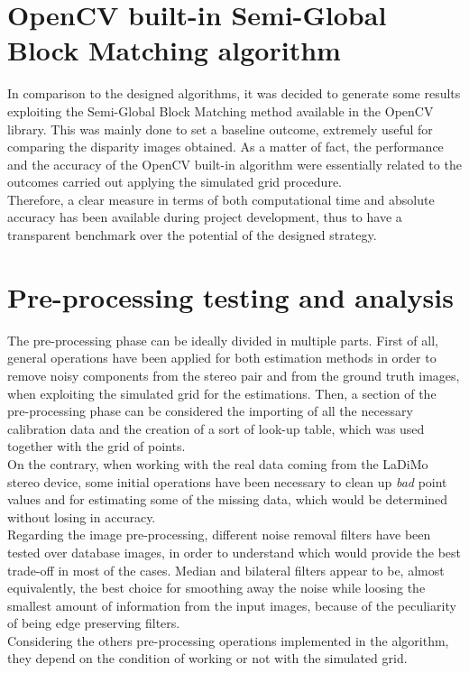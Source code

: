 \section{OpenCV built-in Semi-Global Block Matching algorithm}
\label{section:opencv-sgm-method}

In comparison to the designed algorithms, it was decided to generate some results exploiting the Semi-Global Block Matching method available in the OpenCV library.
This was mainly done to set a baseline outcome, extremely useful for comparing the disparity images obtained.
As a matter of fact, the performance and the accuracy of the OpenCV built-in algorithm were essentially related to the outcomes carried out applying the simulated grid procedure.\\
Therefore, a clear measure in terms of both computational time and absolute accuracy has been available during project development, thus to have a transparent benchmark over the potential of the designed strategy.

\section{Pre-processing testing and analysis}
\label{section:pre-processing-impl}

The pre-processing phase can be ideally divided in multiple parts.
First of all, general operations have been applied for both estimation methods in order to remove noisy components from the stereo pair and from the ground truth images, when exploiting the simulated grid for the estimations.
Then, a section of the pre-processing phase can be considered the importing of all the necessary calibration data and the creation of a sort of look-up table, which was used together with the grid of points.\\
On the contrary, when working with the real data coming from the LaDiMo stereo device, some initial operations have been necessary to clean up \textit{bad} point values and for estimating some of the missing data, which would be determined without losing in accuracy. \\
Regarding the image pre-processing, different noise removal filters have been tested over database images, in order to understand which would provide the best trade-off in most of the cases. 
Median and bilateral filters appear to be, almost equivalently, the best choice for smoothing away the noise while loosing the smallest amount of information from the input images, because of the peculiarity of being edge preserving filters. \\
Considering the others pre-processing operations implemented in the algorithm, they depend on the condition of working or not with the simulated grid.

